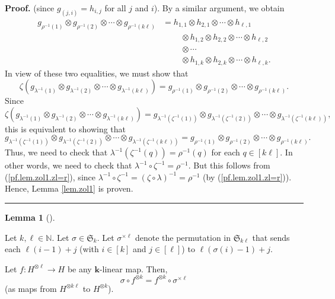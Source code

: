 \documentclass[numbers=enddot,12pt,final,onecolumn,notitlepage]{scrartcl}%
\theoremstyle{definition}
\newtheorem{lem}[theo]{Lemma}
\newenvironment{lemma}[1][]
{\begin{lem}[#1]\begin{leftbar}}
{\end{leftbar}\end{lem}}
\newenvironment{proof}[1][Proof]{\noindent\textbf{#1.} }{\ \rule{0.5em}{0.5em}}
\begin{document}
\begin{proof}
(since $g_{\left(  j,i\right)  }=h_{i,j}$ for all $j$ and $i$). By a similar
argument, we obtain%
\begin{align*}
g_{\rho^{-1}\left(  1\right)  }\otimes g_{\rho^{-1}\left(  2\right)  }%
\otimes\cdots\otimes g_{\rho^{-1}\left(  k\ell\right)  }  &  =h_{1,1}\otimes
h_{2,1}\otimes\cdots\otimes h_{\ell,1}\\
&  \ \ \ \ \ \ \ \ \ \ \otimes h_{1,2}\otimes h_{2,2}\otimes\cdots\otimes
h_{\ell,2}\\
&  \ \ \ \ \ \ \ \ \ \ \otimes\cdots\\
&  \ \ \ \ \ \ \ \ \ \ \otimes h_{1,k}\otimes h_{2,k}\otimes\cdots\otimes
h_{\ell,k}.
\end{align*}
In view of these two equalities, we must show that%
\[
\zeta\left(  g_{\lambda^{-1}\left(  1\right)  }\otimes g_{\lambda^{-1}\left(
2\right)  }\otimes\cdots\otimes g_{\lambda^{-1}\left(  k\ell\right)  }\right)
=g_{\rho^{-1}\left(  1\right)  }\otimes g_{\rho^{-1}\left(  2\right)  }%
\otimes\cdots\otimes g_{\rho^{-1}\left(  k\ell\right)  }.
\]
Since%
\[
\zeta\left(  g_{\lambda^{-1}\left(  1\right)  }\otimes g_{\lambda^{-1}\left(
2\right)  }\otimes\cdots\otimes g_{\lambda^{-1}\left(  k\ell\right)  }\right)
=g_{\lambda^{-1}\left(  \zeta^{-1}\left(  1\right)  \right)  }\otimes
g_{\lambda^{-1}\left(  \zeta^{-1}\left(  2\right)  \right)  }\otimes
\cdots\otimes g_{\lambda^{-1}\left(  \zeta^{-1}\left(  k\ell\right)  \right)
},
\]
this is equivalent to showing that
\[
g_{\lambda^{-1}\left(  \zeta^{-1}\left(  1\right)  \right)  }\otimes
g_{\lambda^{-1}\left(  \zeta^{-1}\left(  2\right)  \right)  }\otimes
\cdots\otimes g_{\lambda^{-1}\left(  \zeta^{-1}\left(  k\ell\right)  \right)
}=g_{\rho^{-1}\left(  1\right)  }\otimes g_{\rho^{-1}\left(  2\right)
}\otimes\cdots\otimes g_{\rho^{-1}\left(  k\ell\right)  }.
\]
Thus, we need to check that $\lambda^{-1}\left(  \zeta^{-1}\left(  q\right)
\right)  =\rho^{-1}\left(  q\right)  $ for each $q\in\left[  k\ell\right]  $.
In other words, we need to check that $\lambda^{-1}\circ\zeta^{-1}=\rho^{-1}$.
But this follows from (\ref{pf.lem.zol1.zl=r}), since $\lambda^{-1}\circ
\zeta^{-1}=\left(  \zeta\circ\lambda\right)  ^{-1}=\rho^{-1}$ (by
(\ref{pf.lem.zol1.zl=r})). Hence, Lemma \ref{lem.zol1} is proven.
\end{proof}

\begin{lemma}
\label{lem.pixl}Let $k,\ell\in\mathbb{N}$. Let $\sigma\in\mathfrak{S}_{k}$.
Let $\sigma^{\times\ell}$ denote the permutation in $\mathfrak{S}_{k\ell}$
that sends each $\ell\left(  i-1\right)  +j$ (with $i\in\left[  k\right]  $
and $j\in\left[  \ell\right]  $) to $\ell\left(  \sigma\left(  i\right)
-1\right)  +j$.

Let $f:H^{\otimes\ell}\rightarrow H$ be any $\mathbf{k}$-linear map. Then,%
\[
\sigma\circ f^{\otimes k}=f^{\otimes k}\circ\sigma^{\times\ell}%
\]
(as maps from $H^{\otimes k\ell}$ to $H^{\otimes k}$).
\end{lemma}
\end{document}
